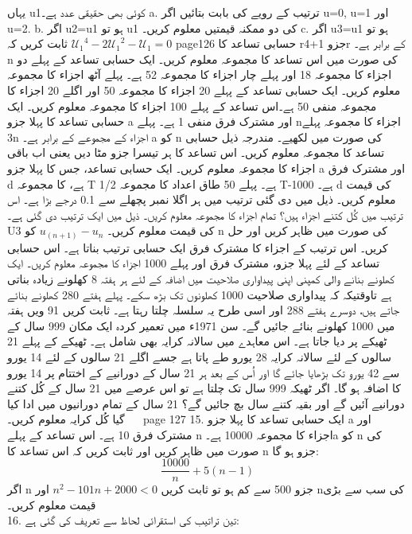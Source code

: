 یہاں  u1کوئی بھی حقیقی عدد ہے۔
a.	ترتیب کے رویے کی بابت بتائیں اگر u=0, u=1 اور u=2.
b.	اگر u2=u1 ہو تو u1 کی دو ممکنہ قیمتیں معلوم کریں۔
c.	اگر u3=u1 ہو تو ثابت کریں کہ
\({\mathcal{U}_1}^4-2{\mathcal{U}_1}^2-\mathcal{U}_1=0\)
\clearpage
page126
	حسابی تساعد کا rجزو 1+4r کے برابر ہے۔ n کی صورت میں اس تساعد کا مجموعہ معلوم کریں۔
	ایک حسابی تساعد کے پہلے دو اجزاء کا مجموعہ 18 اور پہلے چار اجزاء کا مجموعہ 52 ہے۔ پہلے آٹھ اجزاء کا مجموعہ معلوم کریں۔
	ایک حسابی تساعد کے پہلے 20 اجزاء کا مجموعہ 50 اور اگلے 20 اجزاء کا مجموعہ منفی 50 ہے۔اس تساعد کے پہلے 100 اجزاء کا مجموعہ معلوم کریں۔
	ایک حسابی تساعد کا پہلا جزو a اور مشترک فرق منفی 1 ہے۔ پہلے nاجزاء کا مجموعہ پہلے 3n اجزاء کے مجموعے کے برابر ہے۔ a کو n کی صورت میں لکھیے۔
	مندرجہ ذیل حسابی تساعد کا مجموعہ معلوم کریں۔
اس تساعد کا ہر تیسرا جزو مٹا دیں یعنی
اب باقی اجزاء کا مجموعہ معلوم کریں۔
	ایک حسابی تساعد، جس کا پہلا جزو a اور مشترک فرق d ہے، کا مجموعہ T ہے۔ پہلے 50 طاق اعداد کا مجموعہ 1/2 T-1000 ہے۔ d کی قیمت معلوم کریں۔
	ذیل میں دی گئی ترتیب میں ہر اگلا نمبر پچھلے سے 0.1 درجے بڑا ہے۔
	اس ترتیب میں کُل کتنے اجزاء ہیں؟
	تمام اجزاء کا مجموعہ معلوم کریں۔
	ذیل میں ایک ترتیب دی گئی ہے۔
	U3 کی قیمت معلوم کریں۔
	\(  u_{(n+1)}-u_{n}\)
	   کو n کی صورت میں ظاہر کریں اور حل کریں۔
	اس ترتیب کے اجزاء کا مشترک فرق ایک حسابی ترتیب بناتا ہے۔ اس حسابی تساعد کے لئے پہلا جزو، مشترک فرق اور پہلے 1000 اجزاء کا مجموعہ معلوم کریں۔
	ایک کھلونے بنانے والی کمپنی اپنی پیداواری صلاحیت میں اضافہ کے لئے ہر ہفتہ 8 کھلونے زیادہ بناتی ہے تاوقتیکہ کہ پیداواری صلاحیت 1000 کھلونوں تک بڑھ سکے۔  پہلے ہفتے 280 کھلونے بنائے جاتے ہیں، دوسرے ہفتے 288 اور اسی طرح یہ سلسلہ چلتا رہتا ہے۔ ثابت کریں 91 ویں ہفتہ میں 1000 کھلونے بنائے جائیں گے۔
	سن 1971ء میں تعمیر کردہ ایک مکان 999 سال کے ٹھیکے پر دیا جاتا ہے۔ اس معاہدے میں سالانہ کرایہ بھی شامل ہے۔ ٹھیکے کے پہلے 21 سالوں کے لئے سالانہ کرایہ 28 یورو طے پاتا ہے جسے اگلے 21 سالوں کے لئے 14 یورو سے 42 یورو تک بڑھایا جائے گا اور اُس کے بعد ہر 21 سال کے دورانیے کے اختتام پر 14 یورو کا اضافہ ہو گا۔
	اگر ٹھیکہ 999 سال تک چلتا ہے تو اس عرصے میں 21 سال کے کُل کتنے دورانیے آئیں گے اور بقیہ کتنے سال بچ جائیں گے؟
	21 سال کے تمام دورانیوں میں ادا کیا گیا کُل کرایہ معلوم کریں۔
 
\clearpage
page 127
15.	ایک حسابی تساعد کا پہلا جزو a اور مشترک فرق 10 ہے۔ اس تساعد کے پہلے n اجزاء کا مجموعہ 10000 ہے۔a کو n کی صورت میں ظاہر کریں اور ثابت کریں کہ اس تساعد کا n جزو ہو گا:
\[\frac{10000}{n}+5(n-1)\]
اگر n جزو 500 سے کم ہو تو ثابت کریں
\(n^{2}-101n+2000<0\)
	 اور nکی سب سے بڑی قیمت معلوم کریں۔\\
16.	تین تراتیب کی استقرائی لحاظ سے تعریف کی گئی ہے:\\
